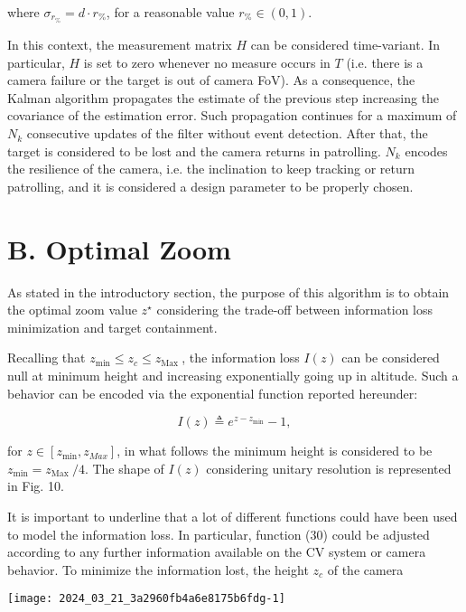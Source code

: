 \documentclass[conference]{IEEEtran}
\begin{document}
where $\sigma_{r_{\%}}=d \cdot r_{\%}$, for a reasonable value $r_{\%} \in(0,1)$.

In this context, the measurement matrix $H$ can be considered time-variant. In particular, $H$ is set to zero whenever no measure occurs in $T$ (i.e. there is a camera failure or the target is out of camera FoV). As a consequence, the Kalman algorithm propagates the estimate of the previous step increasing the covariance of the estimation error. Such propagation continues for a maximum of $N_{k}$ consecutive updates of the filter without event detection. After that, the target is considered to be lost and the camera returns in patrolling. $N_{k}$ encodes the resilience of the camera, i.e. the inclination to keep tracking or return patrolling, and it is considered a design parameter to be properly chosen.

\section*{B. Optimal Zoom}
As stated in the introductory section, the purpose of this algorithm is to obtain the optimal zoom value $z^{\star}$ considering the trade-off between information loss minimization and target containment.

Recalling that $z_{\min } \leq z_{c} \leq z_{\text {Max }}$, the information loss $I(z)$ can be considered null at minimum height and increasing exponentially going up in altitude. Such a behavior can be encoded via the exponential function reported hereunder:


\begin{equation*}
I(z) \triangleq e^{z-z_{\min }}-1, \tag{30}
\end{equation*}


for $z \in\left[z_{\min }, z_{M a x}\right]$, in what follows the minimum height is considered to be $z_{\min }=z_{\text {Max }} / 4$. The shape of $I(z)$ considering unitary resolution is represented in Fig. 10.

It is important to underline that a lot of different functions could have been used to model the information loss. In particular, function (30) could be adjusted according to any further information available on the CV system or camera behavior. To minimize the information lost, the height $z_{c}$ of the camera

\begin{center}
\texttt{[image: 2024\_03\_21\_3a2960fb4a6e8175b6fdg-1]}
\end{center}
\end{document}
